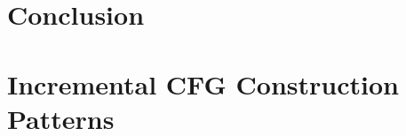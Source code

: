\documentclass[11pt,oneside]{report}
\theoremstyle{plain}
\theoremstyle{definition}
\theoremstyle{remark}
\begin{document}
\chapter{Conclusion}\label{chap:conclusion}


\newpage
\renewcommand\bibname{Bibliography}
{}



\newpage
\appendix

\chapter{Incremental CFG Construction Patterns}
\label{app:cfg-patterns}
\end{document}
